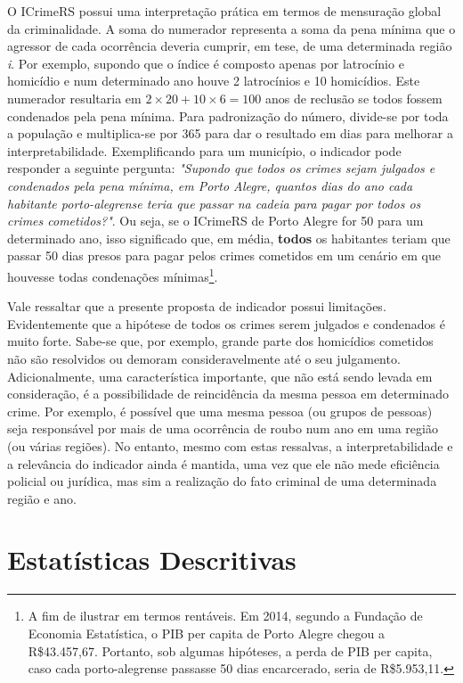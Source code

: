 \documentclass[12pt,openright,oneside,a4paper,english,french,spanish]{abntex2}
\numberwithin{table}{section} %
\numberwithin{figure}{section} %
\begin{document}
O ICrimeRS possui uma interpretação prática em termos de mensuração global da criminalidade. A soma do numerador representa a soma da pena mínima que o agressor de cada ocorrência deveria cumprir, em tese, de uma determinada região \textit{i}. Por exemplo, supondo que o índice é composto apenas por latrocínio e homicídio e num determinado ano houve 2 latrocínios e 10 homicídios. Este numerador resultaria em $2\times 20 + 10\times 6 = 100$ anos de reclusão se todos fossem condenados pela pena mínima. Para padronização do número, divide-se por toda a população e multiplica-se por 365 para dar o resultado em dias para melhorar a interpretabilidade. Exemplificando para um município, o indicador pode responder a seguinte pergunta: \textit{"Supondo que todos os crimes sejam julgados e condenados pela pena mínima, em Porto Alegre, quantos dias do ano cada habitante porto-alegrense teria que passar na cadeia para pagar por todos os crimes cometidos?"}. Ou seja, se o ICrimeRS de Porto Alegre for 50 para um determinado ano, isso significado que, em média, \textbf{todos} os habitantes teriam que passar 50 dias presos para pagar pelos crimes cometidos em um cenário em que houvesse todas condenações mínimas\footnote{A fim de ilustrar em termos rentáveis. Em 2014, segundo a Fundação de Economia  Estatística, o PIB per capita de Porto Alegre chegou a R\$43.457,67. Portanto, sob algumas hipóteses, a perda de PIB per capita, caso cada porto-alegrense passasse 50 dias encarcerado, seria de R\$5.953,11.}.

Vale ressaltar que a presente proposta de indicador possui limitações. Evidentemente que a hipótese de todos os crimes serem julgados e condenados é muito forte. Sabe-se que, por exemplo, grande parte dos homicídios cometidos não são resolvidos ou demoram consideravelmente até o seu julgamento. Adicionalmente, uma característica importante, que não está sendo levada em consideração, é a possibilidade de reincidência da mesma pessoa em determinado crime. Por exemplo, é possível que uma mesma pessoa (ou grupos de pessoas) seja responsável por mais de uma ocorrência de roubo num ano em uma região (ou várias regiões). No entanto, mesmo com estas ressalvas, a interpretabilidade e a relevância do indicador ainda é mantida, uma vez que ele não mede eficiência policial ou jurídica, mas sim a realização do fato criminal de uma determinada região e ano.







\section{Estatísticas Descritivas\label{sec:Resultados_Descritivos}}
\end{document}
